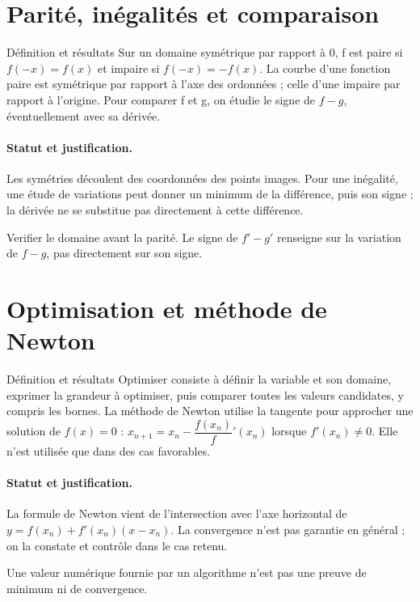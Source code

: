 \section{Parité, inégalités et comparaison}\label{C06-U4}
\begin{repere}{Définition et résultats}
Sur un domaine symétrique par rapport à 0, f est paire si $f(-x)=f(x)$ et impaire si $f(-x)=-f(x)$. La courbe d’une fonction paire est symétrique par rapport à l’axe des ordonnées ; celle d’une impaire par rapport à l’origine. Pour comparer f et g, on étudie le signe de $f-g$, éventuellement avec sa dérivée.
\end{repere}
\paragraph{Statut et justification.} Les symétries découlent des coordonnées des points images. Pour une inégalité, une étude de variations peut donner un minimum de la différence, puis son signe ; la dérivée ne se substitue pas directement à cette différence.
\label{C06-EX4}
\begin{erreur}Verifier le domaine avant la parité. Le signe de $f\prime-g\prime$ renseigne sur la variation de $f-g$, pas directement sur son signe.\end{erreur}
\label{C06-AP4}
\section{Optimisation et méthode de Newton}\label{C06-U5}
\begin{repere}{Définition et résultats}
Optimiser consiste à définir la variable et son domaine, exprimer la grandeur à optimiser, puis comparer toutes les valeurs candidates, y compris les bornes. La méthode de Newton utilise la tangente pour approcher une solution de $f(x)=0$ : $x_{n+1}=x_n-\dfrac{f(x_n)}{f}\prime (x_n)$ lorsque $f\prime(x_n)\ne0$. Elle n’est utilisée que dans des cas favorables.
\end{repere}
\paragraph{Statut et justification.} La formule de Newton vient de l’intersection avec l’axe horizontal de $y=f(x_n)+f\prime(x_n)(x-x_n)$. La convergence n’est pas garantie en général ; on la constate et contrôle dans le cas retenu.
\label{C06-EX5}
\begin{erreur}Une valeur numérique fournie par un algorithme n’est pas une preuve de minimum ni de convergence.\end{erreur}
\label{C06-AP5}
